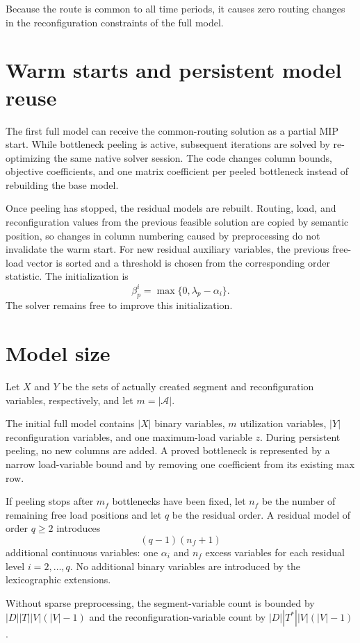 \documentclass[11pt,a4paper]{article}
\newcommand{\Tstar}{T^{\ast}}
\newcommand{\Acal}{\mathcal{A}}
\begin{document}
Because the route is common to all time periods, it causes zero routing changes
in the reconfiguration constraints of the full model.

\section{Warm starts and persistent model reuse}

The first full model can receive the common-routing solution as a partial MIP
start. While bottleneck peeling is active, subsequent iterations are solved by
re-optimizing the same native solver session. The code changes column bounds,
objective coefficients, and one matrix coefficient per peeled bottleneck instead
of rebuilding the base model.

Once peeling has stopped, the residual models are rebuilt. Routing, load, and
reconfiguration values from the previous feasible solution are copied by
semantic position, so changes in column numbering caused by preprocessing do not
invalidate the warm start. For new residual auxiliary variables, the previous
free-load vector is sorted and a threshold is chosen from the corresponding
order statistic. The initialization is
\[
\beta_p^i=\max\{0,\lambda_p-\alpha_i\}.
\]
The solver remains free to improve this initialization.

\section{Model size}

Let $X$ and $Y$ be the sets of actually created segment and reconfiguration
variables, respectively, and let $m=|\Acal|$.

The initial full model contains $|X|$ binary variables, $m$ utilization
variables, $|Y|$ reconfiguration variables, and one maximum-load variable $z$.
During persistent peeling, no new columns are added. A proved bottleneck is
represented by a narrow load-variable bound and by removing one coefficient from
its existing max row.

If peeling stops after $m_f$ bottlenecks have been fixed, let $n_f$ be the number
of remaining free load positions and let $q$ be the residual order. A residual
model of order $q\geq2$ introduces
\[
(q-1)(n_f+1)
\]
additional continuous variables: one $\alpha_i$ and $n_f$ excess variables for
each residual level $i=2,\ldots,q$. No additional binary variables are introduced
by the lexicographic extensions.

Without sparse preprocessing, the segment-variable count is bounded by
$|D||T||V|(|V|-1)$ and the reconfiguration-variable count by
$|D||\Tstar||V|(|V|-1)$.
\end{document}
